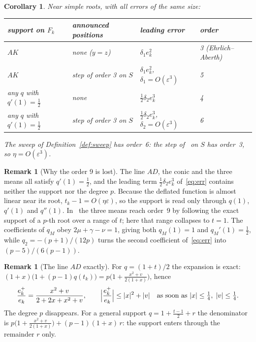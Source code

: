 \documentclass[10pt,a4paper]{article}
\newtheorem{corollary}[theorem]{Corollary}
\theoremstyle{definition}
\newtheorem{remark}[theorem]{Remark}
\numberwithin{equation}{section}
\begin{document}
\begin{corollary}\label{cor:order}
Near simple roots, with all errors of the same size:
\begin{center}\small
\begin{tabular}{llll}
\toprule
support on $F_k$ & announced positions & leading error & order\\
\midrule
$AK$ & none ($y=z$) & $\delta_1 e_k^2$ & 3 (Ehrlich--Aberth)\\
$AK$ & step of order 3 on $S$ & $\delta_1 e_k^2$, $\delta_1=O(\varepsilon^3)$ & 5\\
any $q$ with $q'(1)=\frac12$ & none & $\frac12\delta_2 e_k^3$ & 4\\
any $q$ with $q'(1)=\frac12$ & step of order 3 on $S$ & $\frac12\delta_2 e_k^3$, $\delta_2=O(\varepsilon^3)$ & 6\\
\bottomrule
\end{tabular}
\end{center}
The sweep of Definition~\ref{def:sweep} has order~6: the step of~\cite{g2} on $S$ has order~3, so $\eta=O(\varepsilon^3)$.
\end{corollary}

\begin{remark}[Why the order 9 is lost]\label{rem:nine}
The line $AD$, the conic and the three means all satisfy $q'(1)=\frac12$, and the leading term $\frac12\delta_2e_k^3$ of~\eqref{eq:err} contains neither the support nor the degree $p$. Because the deflated function is almost linear near its root, $t_k-1=O(\eta\varepsilon)$, so the support is read only through $q(1)$, $q'(1)$ and $q''(1)$. In~\cite{v31} the three means reach order~9 by following the exact support of a $p$-th root over a range of $t$; here that range collapses to $t=1$. The coefficients of $q_M$ obey $2\mu+\gamma-\nu=1$, giving both $q_M(1)=1$ and $q_M'(1)=\frac12$, while $q_2=-(p+1)/(12p)$ turns the second coefficient of~\eqref{eq:err} into $(p-5)/(6(p-1))$.
\end{remark}

\begin{remark}[The line $AD$ exactly]\label{rem:ad}
For $q=(1+t)/2$ the expansion is exact: $(1+x)\bigl(1+(p-1)q(t_k)\bigr)=p\bigl(1+\frac{x^2+v}{2(1+x)}\bigr)$, hence
\[
 \frac{e_k^+}{e_k}=\frac{x^2+v}{2+2x+x^2+v},\qquad
 \Bigl|\frac{e_k^+}{e_k}\Bigr|\le |x|^2+|v|\quad\text{as soon as }|x|\le\tfrac14,\;|v|\le\tfrac14.
\]
The degree $p$ disappears. For a general support $q=1+\frac{t-1}{2}+r$ the denominator is $p\bigl(1+\frac{x^2+v}{2(1+x)}\bigr)+(p-1)(1+x)\,r$: the support enters through the remainder $r$ only.
\end{remark}
\end{document}

